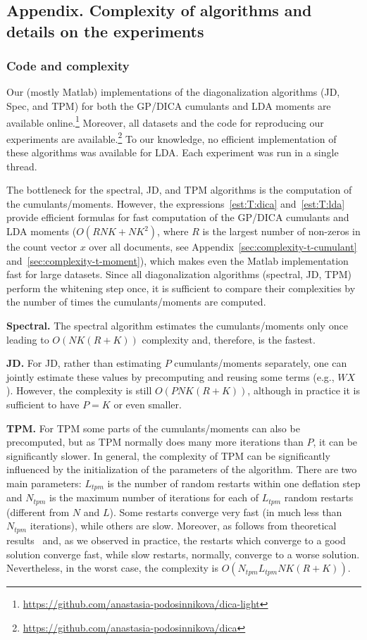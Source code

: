 \documentclass{article}
\begin{document}
\subsection{Appendix. Complexity of algorithms and details on the experiments}

\subsubsection{Code and complexity}\label{sec:code-and-compleixty}

Our (mostly Matlab) implementations of the diagonalization algorithms (JD, Spec, and TPM) for both the GP/DICA cumulants and LDA moments are available online.\footnote{\url{https://github.com/anastasia-podosinnikova/dica-light}} Moreover, all datasets and the code for reproducing our experiments are available.\footnote{\url{https://github.com/anastasia-podosinnikova/dica}}
To our knowledge, no efficient implementation of these algorithms was available for LDA. Each experiment was run in a single thread.

The bottleneck for the spectral, JD, and TPM algorithms is the computation of the cumulants/moments.
However, the expressions~\eqref{est:T:dica} and~\eqref{est:T:lda} provide efficient formulas for fast computation of the GP/DICA cumulants and LDA moments ($O(RNK + NK^2)$, where $R$ is the largest number of non-zeros in the count vector $x$ over all documents, see Appendix~\ref{sec:complexity-t-cumulant} and~\ref{sec:complexity-t-moment}), which makes even the Matlab implementation fast for large datasets. Since all diagonalization algorithms (spectral, JD, TPM) perform the whitening step once,
it is sufficient to compare their complexities by the number of times the cumulants/moments are computed.


\textbf{Spectral.} The spectral algorithm estimates the cumulants/moments only once leading to $O(NK(R+K))$ complexity and, therefore, is the fastest.

\textbf{JD.}
For JD, rather than estimating $P$ cumulants/moments separately, one can jointly estimate these values by precomputing and reusing some terms (e.g., $W X$).
However, the complexity is still $O(PNK(R + K))$, although in practice it is sufficient to have $P=K$ or even smaller.

\textbf{TPM.} For TPM some parts of the cumulants/moments can also be precomputed, but as TPM normally does many more iterations than $P$, it can be significantly slower. 
In general, the complexity of TPM can be significantly influenced by the initialization of the parameters of the algorithm. There are two main parameters: $L_{tpm}$ is the number of random restarts within one deflation step and $N_{tpm}$ is the maximum number of iterations for each of $L_{tpm}$ random restarts (different from $N$ and $L$). Some restarts converge very fast (in much less than $N_{tpm}$ iterations), while others are slow. Moreover, as follows from theoretical results~\cite{AnaEtAl2014} and, as we observed in practice, the restarts which converge to a good solution converge fast, while slow restarts, normally, converge to a worse solution. Nevertheless, in the worst case, the complexity is $O(N_{tpm} L_{tpm}NK(R+K))$.
\end{document}
